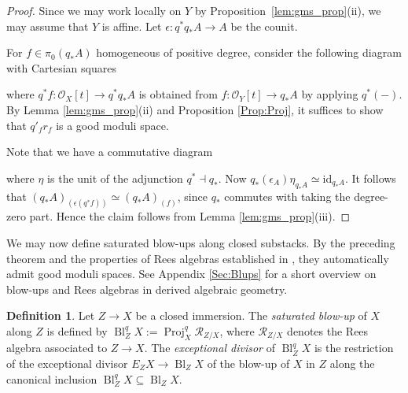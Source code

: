 \documentclass[a4paper,twoside,11pt]{amsart}
\theoremstyle{plain}
\theoremstyle{definition}
\newtheorem{definition}[theorem]{Definition}
\theoremstyle{remark}
\numberwithin{equation}{section}
\newcommand{\id}{\mathrm{id}} %
\DeclareMathOperator{\Spec}{Spec} %
\DeclareMathOperator{\Proj}{Proj} %
\DeclareMathOperator{\Bl}{Bl}
\newcommand{\oO}{\mathcal{O}}
\newcommand{\rR}{\mathcal{R}}
\begin{document}
\begin{proof}
     Since we may work locally on $Y$ by Proposition~\ref{lem:gms_prop}(ii), we may assume that $Y$ is affine. Let $\epsilon \colon q^*q_*A \to A$ be the counit.
     
     For $f \in \pi_0(q_*A)$ homogeneous of positive degree, consider the following diagram with Cartesian squares
     \begin{center}
     \end{center}
     where $q^*f \colon \oO_X[t] \to q^*q_*A$ is obtained from $f \colon \oO_Y[t] \to q_*A$ by applying $q^*(-)$.
     By Lemma \ref{lem:gms_prop}(ii) and Proposition \ref{Prop:Proj}, it suffices to show that $q'_fr_f$ is a good moduli space. 

     Note that we have a commutative diagram
     \begin{center}
     \end{center}
     where $\eta$ is the unit of the adjunction $q^* \dashv q_*$. Now $q_*(\epsilon_A) \eta_{q_*A} \simeq \id_{q_*A} $. It follows that $(q_*A)_{(\epsilon(q^*f))} \simeq (q_*A)_{(f)}$, since $q_*$ commutes with taking the degree-zero part. Hence the claim follows from Lemma \ref{lem:gms_prop}(iii).
\end{proof}

We may now define saturated blow-ups along closed substacks. By the preceding theorem and the properties of Rees algebras established in \cite{Hekking}, they automatically admit good moduli spaces. See Appendix \ref{Sec:Blups} for a short overview on blow-ups and Rees algebras in derived algebraic geometry.

\begin{definition}
    Let $Z \to X$ be a closed immersion. The \emph{saturated blow-up} of $X$ along $Z$ is defined by $\Bl^q_Z X := \Proj_X^q \rR_{Z/X}$, where $\rR_{Z/X}$ denotes the Rees algebra associated to $Z\to X$. The \emph{exceptional divisor} of $\Bl^q_ZX$ is the restriction of the exceptional divisor $E_ZX \to \Bl_ZX$ of the blow-up of $X$ in $Z$ along the canonical inclusion $\Bl^q_ZX \subseteq \Bl_ZX$.
\end{definition}
\end{document}
